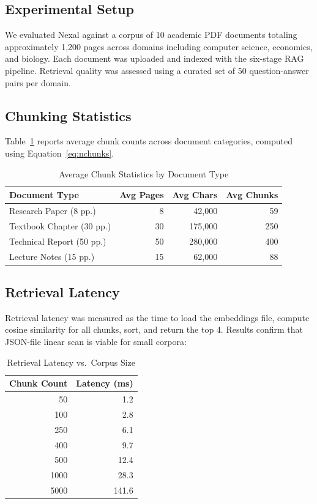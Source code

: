 \documentclass[conference]{IEEEtran}
\begin{document}
\subsection{Experimental Setup}

We evaluated Nexal against a corpus of 10 academic PDF documents totaling approximately 1,200 pages across domains including computer science, economics, and biology. Each document was uploaded and indexed with the six-stage RAG pipeline. Retrieval quality was assessed using a curated set of 50 question-answer pairs per domain.

\subsection{Chunking Statistics}

Table~\ref{tab:chunking} reports average chunk counts across document categories, computed using Equation~\ref{eq:nchunks}.

\begin{table}[H]
\centering
\caption{Average Chunk Statistics by Document Type}
\label{tab:chunking}
\renewcommand{\arraystretch}{1.2}
\begin{tabular}{@{}lrrr@{}}
\toprule
\textbf{Document Type} & \textbf{Avg Pages} & \textbf{Avg Chars} & \textbf{Avg Chunks} \\
\midrule
Research Paper (8 pp.) & 8 & 42,000 & 59 \\
Textbook Chapter (30 pp.) & 30 & 175,000 & 250 \\
Technical Report (50 pp.) & 50 & 280,000 & 400 \\
Lecture Notes (15 pp.) & 15 & 62,000 & 88 \\
\bottomrule
\end{tabular}
\end{table}

\subsection{Retrieval Latency}

Retrieval latency was measured as the time to load the embeddings file, compute cosine similarity for all chunks, sort, and return the top 4. Results confirm that JSON-file linear scan is viable for small corpora:

\begin{table}[H]
\centering
\caption{Retrieval Latency vs.\ Corpus Size}
\label{tab:latency}
\renewcommand{\arraystretch}{1.2}
\begin{tabular}{@{}rr@{}}
\toprule
\textbf{Chunk Count} & \textbf{Latency (ms)} \\
\midrule
50   & 1.2 \\
100  & 2.8 \\
250  & 6.1 \\
400  & 9.7 \\
500  & 12.4 \\
1000 & 28.3 \\
5000 & 141.6 \\
\bottomrule
\end{tabular}
\end{table}
\end{document}
